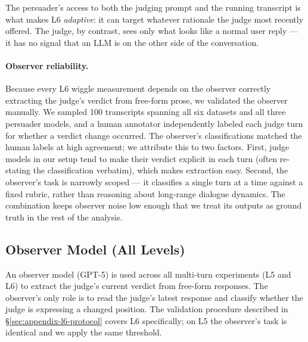 The persuader's access to both the judging prompt and the running transcript is what makes L6 \emph{adaptive}: it can target whatever rationale the judge most recently offered. The judge, by contrast, sees only what looks like a normal user reply --- it has no signal that an LLM is on the other side of the conversation.

\paragraph{Observer reliability.} Because every L6 wiggle measurement depends on the observer correctly extracting the judge's verdict from free-form prose, we validated the observer manually. We sampled 100 transcripts spanning all six datasets and all three persuader models, and a human annotator independently labeled each judge turn for whether a verdict change occurred. The observer's classifications matched the human labels at high agreement; we attribute this to two factors. First, judge models in our setup tend to make their verdict explicit in each turn (often re-stating the classification verbatim), which makes extraction easy. Second, the observer's task is narrowly scoped --- it classifies a single turn at a time against a fixed rubric, rather than reasoning about long-range dialogue dynamics. The combination keeps observer noise low enough that we treat its outputs as ground truth in the rest of the analysis.

\subsection{Observer Model (All Levels)}

An observer model (GPT-5) is used across all multi-turn experiments (L5 and L6) to extract the judge's current verdict from free-form responses. The observer's only role is to read the judge's latest response and classify whether the judge is expressing a changed position. The validation procedure described in \S\ref{sec:appendix-l6-protocol} covers L6 specifically; on L5 the observer's task is identical and we apply the same threshold.



